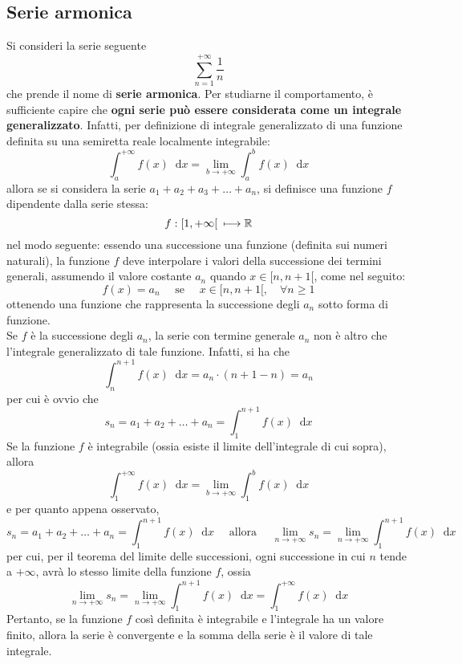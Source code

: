 \documentclass[a4paper]{extarticle}
\newcommand*\dif{\mathop{}\!\mathrm{d}}
\begin{document}
\subsection{Serie armonica}
Si consideri la serie seguente
\[\sum_{n=1}^{+\infty} \frac{1}{n}\]
che prende il nome di \textbf{serie armonica}. Per studiarne il comportamento, è sufficiente capire che \textbf{ogni serie può essere considerata come un integrale generalizzato}. Infatti, per definizione di integrale generalizzato di una funzione definita su una semiretta reale localmente integrabile:
\[\int_a^{+\infty} f(x) \dif x = \lim_{b \to +\infty} \int_a^b f(x) \dif x\]
allora se si considera la serie $a_1+a_2+a_3+\dots+a_n$, si definisce una funzione $f$ dipendente dalla serie stessa:
\[f : [1,+\infty[ \hspace{0.5em} \longmapsto \mathbb{R}\]
nel modo seguente: essendo una successione una funzione (definita sui numeri naturali), la funzione $f$ deve interpolare i valori della successione dei termini generali, assumendo il valore costante $a_n$ quando $x \in [n,n+1[$, come nel seguito:
\[f(x)=a_n \hspace{1em} \text{ se } \hspace{1em} x \in [n,n+1[, \hspace{1em} \forall n \geq 1\]
ottenendo una funzione che rappresenta la successione degli $a_n$ sotto forma di funzione.\\
Se $f$ è la successione degli $a_n$, la serie con termine generale $a_n$ non è altro che l'integrale generalizzato di tale funzione. Infatti, si ha che
\[\int_{n}^{n+1} f(x) \dif x = a_n \cdot (n+1-n) = a_n\]
per cui è ovvio che
\[s_n=a_1+a_2+\dots+a_n=\int_1^{n+1} f(x) \dif x\]
Se la funzione $f$ è integrabile (ossia esiste il limite dell'integrale di cui sopra), allora
\[\int_1^{+\infty} f(x) \dif x = \lim_{b \to +\infty} \int_1^b f(x) \dif x\]
e per quanto appena osservato,
\[s_n=a_1+a_2+\dots+a_n=\int_1^{n+1} f(x) \dif x \hspace{1em} \text{ allora } \hspace{1em} \lim_{n \to +\infty} s_n = \lim_{n \to +\infty} \int_1^{n+1} f(x) \dif x\]
per cui, per il teorema del limite delle successioni, ogni successione in cui $n$ tende a $+\infty$, avrà lo stesso limite della funzione $f$, ossia
\[\lim_{n \to +\infty} s_n = \lim_{n \to +\infty} \int_1^{n+1} f(x) \dif x = \int_1^{+\infty} f(x) \dif x\]
Pertanto, se la funzione $f$ così definita è integrabile e l'integrale ha un valore finito, allora la serie è convergente e la somma della serie è il valore di tale integrale.
\end{document}
